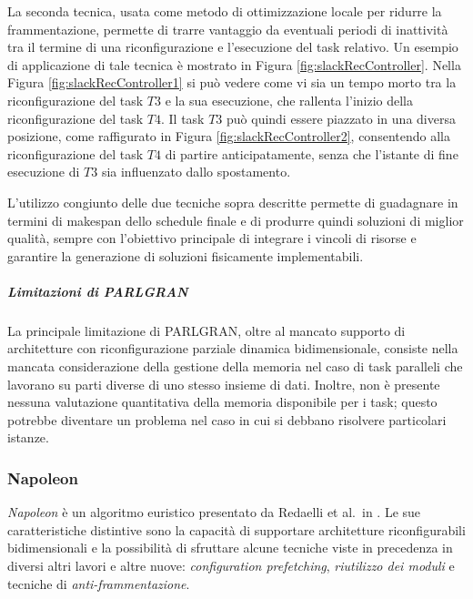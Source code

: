 

La seconda tecnica, usata come metodo di ottimizzazione locale per ridurre la 
frammentazione, permette di trarre vantaggio da eventuali periodi di inattività 
tra il termine di una riconfigurazione e l'esecuzione del task relativo. Un 
esempio di applicazione di tale tecnica è mostrato in Figura 
\ref{fig:slackRecController}. Nella Figura \ref{fig:slackRecController1} si può 
vedere come vi sia un tempo morto tra la riconfigurazione del task $T3$ e la sua 
esecuzione, che rallenta l'inizio della riconfigurazione del task $T4$. Il task 
$T3$ può quindi essere piazzato in una diversa posizione, come raffigurato in 
Figura \ref{fig:slackRecController2}, consentendo alla riconfigurazione del task 
$T4$ di partire anticipatamente, senza che l'istante di fine esecuzione di $T3$ 
sia influenzato dallo spostamento.

L'utilizzo congiunto delle due tecniche sopra descritte permette di guadagnare 
in termini di makespan dello schedule finale e di produrre quindi soluzioni di 
miglior qualità, sempre con l'obiettivo principale di integrare i vincoli di 
risorse e garantire la generazione di soluzioni fisicamente implementabili.


\subparagraph{Limitazioni di PARLGRAN}
La principale limitazione di PARLGRAN, oltre al mancato supporto di 
architetture con riconfigurazione parziale dinamica bidimensionale, consiste 
nella mancata considerazione della gestione della memoria nel caso di task 
paralleli che lavorano su parti diverse di uno stesso insieme di dati. Inoltre, 
non è presente nessuna valutazione quantitativa della memoria disponibile per 
i task; questo potrebbe diventare un problema nel caso in cui si debbano 
risolvere particolari istanze.


\subsubsection{Napoleon}
\emph{Napoleon} è un algoritmo euristico presentato da Redaelli et al.~in 
\cite{Redaelli2DILP}. Le sue caratteristiche distintive sono la capacità di 
supportare architetture riconfigurabili bidimensionali e la possibilità di 
sfruttare alcune tecniche viste in precedenza in diversi altri lavori e altre 
nuove: \emph{configuration prefetching}, \emph{riutilizzo dei moduli} e 
tecniche di \emph{anti-frammentazione}.

